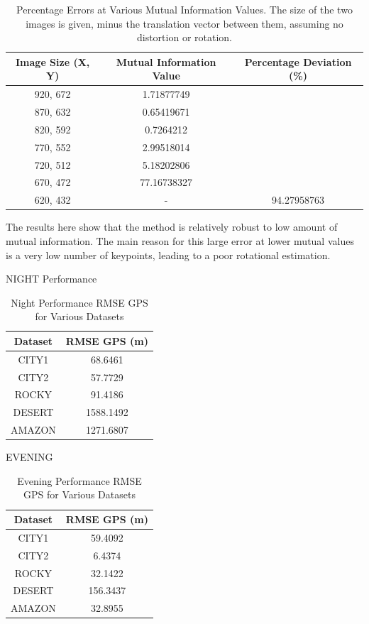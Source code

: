 \begin{table}[H]
    \centering
    \caption{Percentage Errors at Various Mutual Information Values. The size of the two images is given, minus the translation vector between them, assuming no distortion or rotation.}
    \begin{tabular}{|c|c|c|}
    \hline
    \textbf{Image Size (X, Y)} & \textbf{Mutual Information Value} & \textbf{Percentage Deviation (\%)} \\ \hline
    920, 672 & 1.71877749 &  \\ \hline
    870, 632 & 0.65419671 &  \\ \hline
    820, 592 & 0.7264212 &  \\ \hline
    770, 552 & 2.99518014 &  \\ \hline
    720, 512 & 5.18202806 &  \\ \hline
    670, 472 & 77.16738327 &  \\ \hline
    620, 432 & - & 94.27958763 \\ \hline
    \end{tabular}
    \end{table}
    

The results here show that the method is relatively robust to low amount of mutual information. The main reason for this large error at lower mutual values is a very low number of keypoints, leading to a poor rotational estimation. 

NIGHT Performance

\begin{table}[H]
    \centering
    \caption{Night Performance RMSE GPS for Various Datasets}
    \begin{tabular}{|c|c|}
    \hline
    \textbf{Dataset} & \textbf{RMSE GPS (m)} \\ \hline
    CITY1 & 68.6461 \\ \hline
    CITY2 & 57.7729 \\ \hline
    ROCKY & 91.4186 \\ \hline
    DESERT & 1588.1492 \\ \hline
    AMAZON & 1271.6807 \\ \hline
    \end{tabular}
    \end{table}
    


EVENING
\begin{table}[H]
    \centering
    \caption{Evening Performance RMSE GPS for Various Datasets}
    \begin{tabular}{|c|c|}
    \hline
    \textbf{Dataset} & \textbf{RMSE GPS (m)} \\ \hline
    CITY1 & 59.4092 \\ \hline
    CITY2 & 6.4374 \\ \hline
    ROCKY & 32.1422 \\ \hline
    DESERT & 156.3437 \\ \hline
    AMAZON & 32.8955 \\ \hline
    \end{tabular}
    \end{table}




